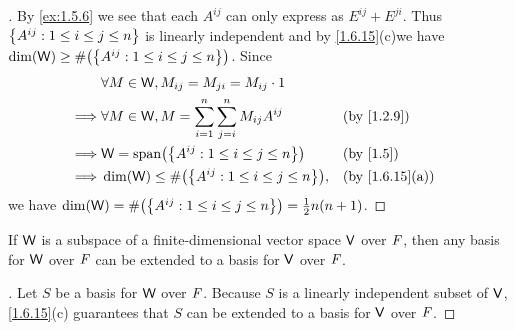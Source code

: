 \begin{proof}[]
	By \cref{ex:1.5.6} we see that each \(A^{i j}\) can only express as \(E^{i j} + E^{j i}\).
	Thus \(\left\lbrace A^{i j} : 1 \leq i \leq j \leq n\right\rbrace\) is linearly independent and by \cref{1.6.15}(c)we have  \(\dim(\W) \geq \#\pa{\set{A^{i j} : 1 \leq i \leq j \leq n}}\).
	Since
	\begin{align*}
		         & \forall M \in \W, M_{i j} = M_{j i} = M_{i j} \cdot 1                                   \\
		\implies & \forall M \in \W, M = \sum_{i = 1}^n \sum_{j = i}^n M_{i j} A^{i j} &  & \by{1.2.9}     \\
		\implies & \W = \spn{\set{A^{i j} : 1 \leq i \leq j \leq n}}                   &  & \by{1.5}       \\
		\implies & \dim(\W) \leq \#\pa{\set{A^{i j} : 1 \leq i \leq j \leq n}},        &  & \by{1.6.15}[a]
	\end{align*}
	we have \(\dim(\W) = \#\pa{\set{A^{i j} : 1 \leq i \leq j \leq n}} = \frac{1}{2} n(n + 1)\).
\end{proof}

\begin{cor}\label{1.6.19}
	If \(\mathsf{W}\) is a subspace of a finite-dimensional vector space \(\mathsf{V}\) over \(\mathit{F}\), then any basis for \(\mathsf{W}\) over \(\mathit{F}\) can be extended to a basis for \(\mathsf{V}\) over \(\mathit{F}\).
\end{cor}

\begin{proof}[]
	Let \(S\) be a basis for \(\mathsf{W}\) over \(\mathit{F}\).
	Because \(S\) is a linearly independent subset of \(\mathsf{V}\), \cref{1.6.15}(c) guarantees that \(S\) can be extended to a basis for \(\mathsf{V}\) over \(\mathit{F}\).
\end{proof}

